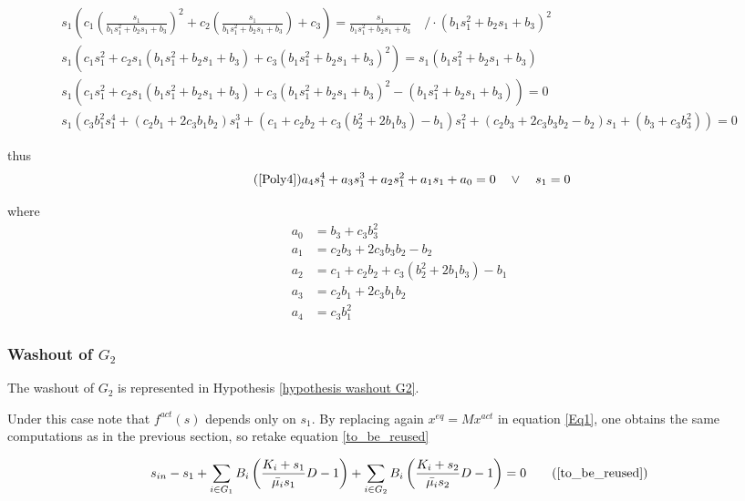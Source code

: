 \documentclass[3p,times]{article}
\begin{document}
\begin{align}
s_1\left( c_1\left( \frac{s_1}{b_1s_1^2+b_2s_1+b_3} \right)^2 + c_2\left( \frac{s_1}{b_1s_1^2+b_2s_1+b_3} \right) + c_3 \right) =  \frac{s_1}{b_1s_1^2+b_2s_1+b_3}  \quad /\cdot  \left(b_1s_1^2+b_2s_1+b_3\right)^2\\
s_1\left( c_1s_1^2 + c_2s_1\left(b_1s_1^2+b_2s_1+b_3\right)  + c_3\left(b_1s_1^2+b_2s_1+b_3\right)^2 \right) =  s_1\left(b_1s_1^2+b_2s_1+b_3\right) \\
s_1\left( c_1s_1^2 + c_2s_1\left(b_1s_1^2+b_2s_1+b_3\right)  + c_3\left(b_1s_1^2+b_2s_1+b_3\right)^2 - \left(b_1s_1^2+b_2s_1+b_3\right) \right) = 0 \\
s_1\left( c_3b_1^2s_1^4+(c_2b_1+2c_3b_1b_2)s_1^3+(c_1+c_2b_2 +c_3(b_2^2 + 2b_1b_3)-b_1)s_1^2+(c_2b_3+2c_3b_3b_2 -b_2)s_1+(b_3 + c_3b_3^2)\right) = 0 
\end{align} 

thus 
\begin{align}
\tag{\ref{Poly4}} a_4s_1^4+a_3s_1^3+a_2s_1^2+a_1s_1+a_0 = 0 \quad  \vee \quad s_1 = 0
\end{align}

where 
\begin{align}
a_0 & = b_3 + c_3b_3^2\\
a_1 & = c_2b_3+2c_3b_3b_2 -b_2\\
a_2 & = c_1+c_2b_2 +c_3(b_2^2 + 2b_1b_3)-b_1 \\
a_3 & = c_2b_1+2c_3b_1b_2\\
a_4 & = c_3b_1^2
\end{align}



\subsubsection{Washout of $G_2$}

The washout of $G_2$ is represented in Hypothesis \ref{hypothesis washout G2}. 

Under this case note that $f^{act}(s)$ depends only on $s_1$. By replacing again $x^{eq} = Mx^{act}$ in equation \eqref{Eq1}, one obtains the same computations as in the previous section, so retake equation \eqref{to_be_reused}

\begin{align}
\displaystyle s_{in} - s_1 + \sum \limits_{i \in G_1} B_i \left(\dfrac{K_i+s_1}{\bar{\mu_i}s_1}D - 1 \right) + \sum \limits_{i \in G_2 } B_i \left(\dfrac{K_i+s_2}{\bar{\mu_i}s_2}D - 1 \right)= 0  \tag{\ref{to_be_reused}}
\end{align}
\end{document}
